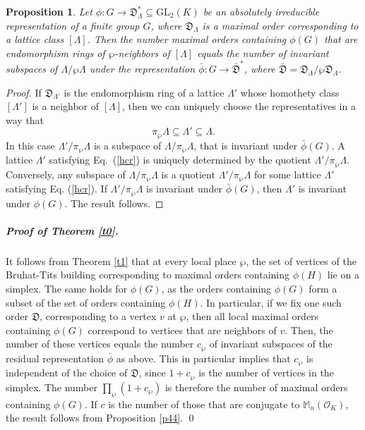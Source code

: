 \documentclass{article}
\newtheorem{prop}{Proposition}[section]
\theoremstyle{definition}
\begin{document}
\begin{prop}
    Let $\phi:G\rightarrow\mathfrak{D}_\Lambda^*\subseteq\mathrm{GL}_2(K)$ 
    be an absolutely irreducible representation of a finite group $G$,
    where $\mathfrak{D}_\Lambda$ is a maximal order corresponding to a 
    lattice class $[\Lambda]$. Then the number maximal orders containing
    $\phi(G)$ that are endomorphism rings of $\wp$-neighbors of $[\Lambda]$ 
    equals the number of invariant subspaces of $\Lambda/\wp\Lambda$ under 
    the representation $\bar{\phi}:G\rightarrow\bar{\mathfrak{D}}^*$,
    where $\bar{\mathfrak{D}}=\mathfrak{D}_\Lambda/\wp\mathfrak{D}_\Lambda$.
\end{prop}

\begin{proof}
    If $\mathfrak{D}_{\Lambda'}$ is the endomorphism ring of a lattice
    $\Lambda'$ whose homothety class $[\Lambda']$ is a neighbor of 
    $[\Lambda]$, then we can uniquely choose the representatives in a way that
    \begin{equation}\label{hcr}
        \pi_\wp\Lambda\subseteq\Lambda'\subseteq\Lambda.
    \end{equation}
    In this case $\Lambda'/\pi_\wp\Lambda$ is a subspace of 
    $\Lambda/\pi_\wp\Lambda$, that is invariant under $\bar{\phi}(G)$. A 
    lattice $\Lambda'$ satisfying Eq.~(\ref{hcr}) is uniquely determined by 
    the quotient $\Lambda'/\pi_\wp\Lambda$. Conversely, any subspace of 
    $\Lambda/\pi_\wp\Lambda$ is a quotient $\Lambda'/\pi_\wp\Lambda$ for some 
    lattice $\Lambda'$ satisfying Eq. (\ref{hcr}). If $\Lambda'/\pi_\wp\Lambda$ 
    is invariant under $\bar{\phi}(G)$, then $\Lambda'$ is invariant under 
    $\phi(G)$. The result follows.
\end{proof}

\subparagraph{Proof of Theorem \ref{t0}.}
    It follows from Theorem \ref{t1} that at every local place
    $\wp$, the set of vertices of the Bruhat-Tits building corresponding to
    maximal orders containing $\phi(H)$ lie on a simplex. The same holds for
    $\phi(G)$, as the orders containing $\phi(G)$ form a subset of the set
    of orders containing $\phi(H)$. In particular, if we fix one such order
    $\mathfrak{D}$, corresponding to a vertex $v$ at $\wp$, then all local 
    maximal orders containing $\phi(G)$ correspond to vertices that are
    neighbors of $v$. Then, the number of these vertices equals the number
    $c_\wp$ of invariant subspaces of the residual representation 
    $\bar\phi$ as above. This in particular implies that $c_\wp$ is
    independent of the choice of $\mathfrak{D}$, since $1+c_\wp$ is
    the number of vertices in the simplex. The number 
    $\prod_\wp(1+c_\wp)$ is therefore the number of maximal orders 
    containing
    $\phi(G)$. If $c$ is the number of those that are conjugate to
    $\mathbb{M}_n(\mathcal{O}_K)$, the result follows from 
    Proposition \ref{p44}.
\qed
\end{document}
